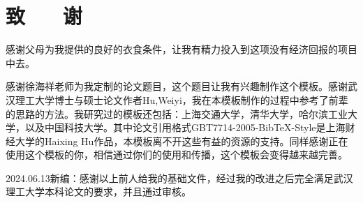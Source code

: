 \section*{致 ~~ 谢}
感谢父母为我提供的良好的衣食条件，让我有精力投入到这项没有经济回报的项目中去。

感谢徐海祥老师为我定制的论文题目，这个题目让我有兴趣制作这个模板。感谢武汉理工大学博士与硕士论文作者Hu,Weiyi，我在本模板制作的过程中参考了前辈的思路的方法。我研究过的模板还包括：上海交通大学，清华大学，哈尔滨工业大学，以及中国科技大学。其中论文引用格式GBT7714-2005-BibTeX-Style是上海财经大学的Haixing Hu作品，本模板离不开这些有益的资源的支持。同样感谢正在使用这个模板的你，相信通过你们的使用和传播，这个模板会变得越来越完善。

2024.06.13新编：感谢以上前人给我的基础文件，经过我的改进之后完全满足武汉理工大学本科论文的要求，并且通过审核。